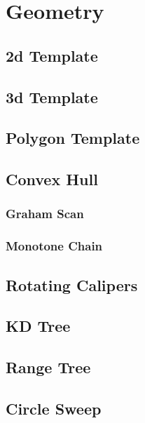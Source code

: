 \documentclass[10pt,a4paper]{report}
\begin{document}
\chapter{Geometry}
	\section{2d Template}
	\section{3d Template}
	\section{Polygon Template}
	\section{Convex Hull}
		\subsection{Graham Scan}
		\subsection{Monotone Chain}
	\section{Rotating Calipers}
	\section{KD Tree}
	\section{Range Tree}
	\section{Circle Sweep}
	
\end{document}
